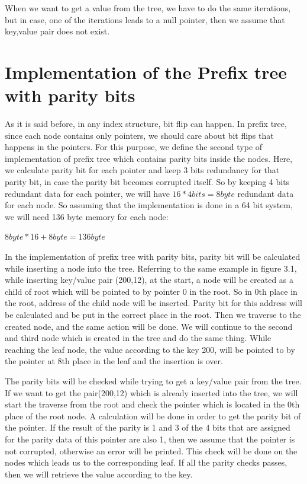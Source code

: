 \documentclass{report}
\begin{document}
When we want to get a value from the tree, we have to do the same iterations, but in case, one of the iterations leads to a null pointer, then we assume that key,value pair does not exist. 

\section{Implementation of the Prefix tree with parity bits}

As it is said before, in any index structure, bit flip can happen. In prefix tree, since each node contains only pointers, we should care about bit flips that happens in the pointers. For this purpose, we define the second type of implementation of prefix tree which contains parity bits inside the nodes. Here, we calculate parity bit for each pointer and keep 3 bits redundancy for that parity bit, in case the parity bit becomes corrupted itself. So by keeping 4 bits redundant data for each pointer, we will have $16*4 bits=8 byte$ redundant data for each node. So assuming that the implementation is done in a 64 bit system, we will need 136 byte memory for each node:


$8byte*16+8byte=136 byte$    

In the implementation of prefix tree with parity bits, parity bit will be calculated  while inserting a node into the tree. Referring to the same example in figure 3.1, while inserting key/value pair (200,12), at the start, a node will be created as a child of root which will be pointed to by pointer 0 in the root. So in 0th place in the root, address of the child node will be inserted. Parity bit for this address will be calculated and be put in the correct place in the root. Then we traverse to the created node, and the same action will be done. We will continue to the second and third node which is created in the tree and do the same thing. While reaching the leaf node, the value according to the key 200, will be pointed to by the pointer at 8th place in the leaf and the insertion is over.

The parity bits will be checked while trying to get a key/value pair from the tree. If we want to get the pair(200,12) which is already inserted into the tree, we will start the traverse from the root and check the pointer which is located in the 0th place of the root node. A calculation will be done in order to get the parity bit of the pointer. If the result of the parity is 1 and 3 of the 4 bits that are assigned for the parity data of this pointer are also 1, then we assume that the pointer is not corrupted, otherwise an error will be printed. This check will be done on the nodes which leads us to the corresponding leaf. If all the parity checks passes, then we will retrieve the value according to the key.
\end{document}
